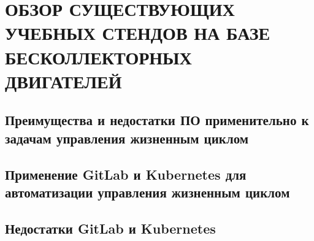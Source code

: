 \chapter{ОБЗОР СУЩЕСТВУЮЩИХ УЧЕБНЫХ СТЕНДОВ НА БАЗЕ БЕСКОЛЛЕКТОРНЫХ ДВИГАТЕЛЕЙ}
\label{cha:analysis}

\section{Преимущества и недостатки ПО применительно к задачам управления жизненным циклом}

\section{Применение GitLab и Kubernetes для автоматизации управления жизненным циклом}

\cite{kubertenes}
\cite{gitlab}

\section{Недостатки GitLab и Kubernetes}


